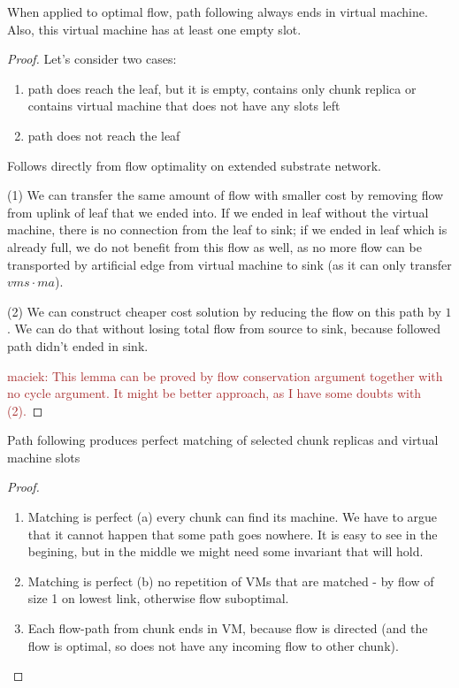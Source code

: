\documentclass[9pt,twocolumn]{scrartcl}
\newcommand{\maciek}[1]{\textcolor{brown}{maciek: #1}}
\begin{document}
\begin{lemma}
  When applied to optimal flow, path following always ends in virtual machine. Also, this virtual machine has at least one empty slot.
\end{lemma}
\begin{proof}
  Let's consider two cases:
  \begin{enumerate}
    \item path does reach the leaf, but it is empty, contains only chunk replica or contains virtual machine that does not have any slots left
    \item path does not reach the leaf
  \end{enumerate}
 Follows directly from flow optimality on extended substrate network.
 
  (1) We can transfer the same amount of flow with smaller cost by removing flow from uplink of leaf that we ended into. If we ended in leaf without the virtual machine, there is no connection from the leaf to sink; if we ended in leaf which is already full, we do not benefit from this flow as well, as no more flow can be transported by artificial edge from virtual machine to sink (as it can only transfer $vms \cdot ma$).

  (2) We can construct cheaper cost solution by reducing the flow on this path by $1$. We can do that without losing total flow from source to sink, because followed path didn't ended in sink.

 \maciek{This lemma can be proved by flow conservation argument together with no cycle argument. It might be better approach, as I have some doubts with (2).}
\end{proof}

\begin{lemma}Path following produces perfect matching of selected chunk replicas and virtual machine slots
\end{lemma}
\begin{proof}
  \begin{enumerate}
\item  Matching is perfect (a) every chunk can find its machine. We have to argue that it cannot happen that some path goes nowhere. It is easy to see in the begining, but in the middle we might need some invariant that will hold.
  
\item Matching is perfect (b) no repetition of VMs that are matched - by flow of size 1 on lowest link, otherwise flow suboptimal.

  \item Each flow-path from chunk ends in VM, because flow is directed (and the flow is optimal, so does not have any incoming flow to other chunk).
  \end{enumerate}

\end{proof}
\end{document}

